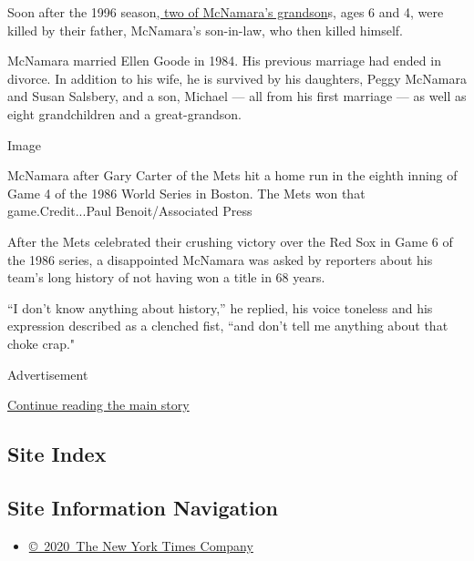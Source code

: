 Soon after the 1996
season\href{https://www.upi.com/Archives/1996/10/17/McNamara-grandsons-killed-by-dad/8841845524800/}{,
two of McNamara's grandson}s, ages 6 and 4, were killed by their father,
McNamara's son-in-law, who then killed himself.

McNamara married Ellen Goode in 1984. His previous marriage had ended in
divorce. In addition to his wife, he is survived by his daughters, Peggy
McNamara and Susan Salsbery, and a son, Michael --- all from his first
marriage --- as well as eight grandchildren and a great-grandson.

Image

McNamara after Gary Carter of the Mets hit a home run in the eighth
inning of Game 4 of the 1986 World Series in Boston. The Mets won that
game.Credit...Paul Benoit/Associated Press

After the Mets celebrated their crushing victory over the Red Sox in
Game 6 of the 1986 series, a disappointed McNamara was asked by
reporters about his team's long history of not having won a title in 68
years.

``I don't know anything about history,'' he replied, his voice toneless
and his expression described as a clenched fist, ``and don't tell me
anything about that choke crap."

Advertisement

\protect\hyperlink{after-bottom}{Continue reading the main story}

\hypertarget{site-index}{%
\subsection{Site Index}\label{site-index}}

\hypertarget{site-information-navigation}{%
\subsection{Site Information
Navigation}\label{site-information-navigation}}

\begin{itemize}
\tightlist
\item
  \href{https://help.nytimes3xbfgragh.onion/hc/en-us/articles/115014792127-Copyright-notice}{©~2020~The
  New York Times Company}
\end{itemize}

